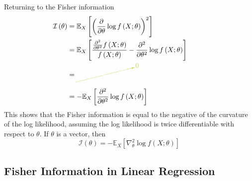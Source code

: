 \documentclass[11pt]{report} %
\begin{document}
Returning to the Fisher information
\begin{align}
\mathcal{I}\left(\theta\right) &= \mathbb{E}_{X}\left[\left(\dfrac{\partial}{\partial \theta}\log f\left(X;\theta\right)\right)^{2}\right] \\
&= \mathbb{E}_{X}\left[\dfrac{\frac{\partial^{2}}{\partial \theta^{2}}f\left(X;\theta\right)}{f\left(X;\theta\right)} - \dfrac{\partial^{2}}{\partial \theta^{2}}\log f\left(X;\theta\right)\right] \\
&= \green\cancelto{0}{\black \mathbb{E}_{X}\left[\dfrac{\frac{\partial^{2}}{\partial \theta^{2}}f\left(X;\theta\right)}{f\left(X;\theta\right)}\right]}\black - \mathbb{E}_{X}\left[\dfrac{\partial^{2}}{\partial \theta^{2}}\log f\left(X;\theta\right)\right] \\
&= - \mathbb{E}_{X}\left[\dfrac{\partial^{2}}{\partial \theta^{2}}\log f\left(X;\theta\right)\right]
\end{align}
This shows that the Fisher information is equal to the negative of the curvature of the log likelihood, assuming the log likelihood is twice differentiable with respect to $\theta$. If $\theta$ is a vector, then
\begin{equation}
\mathcal{I}\left(\theta\right) = - \mathbb{E}_{X}\left[\nabla_{\theta}^{2}\log f\left(X;\theta\right)\right]
\end{equation}

\subsection{Fisher Information in Linear Regression}
\end{document}
